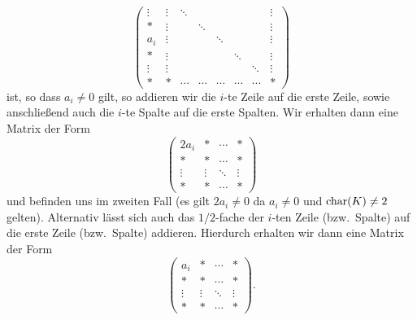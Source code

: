 \begin{enumerate}
\[\begin{pmatrix}
        \vdots  & \vdots  & \ddots  &         &         &         &         & \vdots  \\
        *       & \vdots  &         & \ddots  &         &         &         & \vdots  \\
        a_i     & \vdots  &         &         & \ddots  &         &         & \vdots  \\
        *       & \vdots  &         &         &         & \ddots  &         & \vdots  \\
        \vdots  & \vdots  &         &         &         &         & \ddots  & \vdots  \\
        *       & *       & \cdots  & \cdots  & \cdots  & \cdots  & \cdots  & *
      \end{pmatrix}
    \]
    ist, so dass $a_i \neq 0$ gilt, so addieren wir die $i$-te Zeile auf die erste Zeile, sowie anschließend auch die $i$-te Spalte auf die erste Spalten.
    Wir erhalten dann eine Matrix der Form
    \[
      \begin{pmatrix}
        2a_i    & *       & \cdots  & *       \\
        *       & *       & \cdots  & *       \\
        \vdots  & \vdots  & \ddots  & \vdots  \\
        *       & *       & \cdots  & *
      \end{pmatrix}
    \]
    und befinden uns im zweiten Fall (es gilt $2 a_i \neq 0$ da $a_i \neq 0$ und $\operatorname{char}(K) \neq 2$ gelten).
    Alternativ lässt sich auch das $1/2$-fache der $i$-ten Zeile (bzw.\ Spalte) auf die erste Zeile (bzw.\ Spalte) addieren.
    Hierdurch erhalten wir dann eine Matrix der Form
    \[
      \begin{pmatrix}
        a_i     & *       & \cdots  & *       \\
        *       & *       & \cdots  & *       \\
        \vdots  & \vdots  & \ddots  & \vdots  \\
        *       & *       & \cdots  & *
      \end{pmatrix}.
    \]
\end{enumerate}


\addtocounter{subsection}{-2}
\subsection{}

